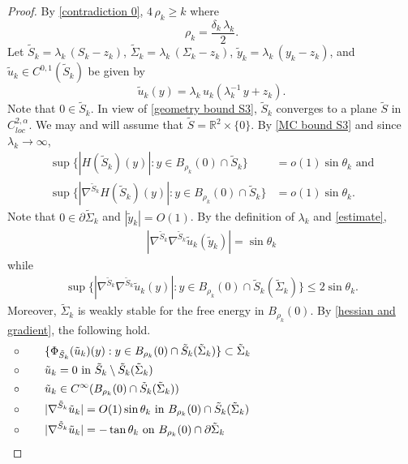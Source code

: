 \documentclass[11pt]{amsart}
\begin{document}
\begin{proof}
 By \eqref{contradiction 0}, $4\,\rho_k\geq k$ where $$\rho_k=\frac{\delta_k\,\lambda_k}2.$$
	Let $\tilde S_k=\lambda_k\,(S_k-z_k)$, $\tilde \Sigma_k=\lambda_k\,(\Sigma_k-z_k)$, $\tilde y_k=\lambda_k\,(y_k-z_k)$, and $\tilde u_k\in C^{0,1}(\tilde S_k)$ be given by 
	$$
	\tilde u_k(y)=\lambda_k\,u_k\left(\lambda_k^{-1}\,y+z_k\right).
	$$
Note that $0\in \tilde S_k$.	In view of \eqref{geometry bound S3}, $\tilde S_k$ converges to a plane $\tilde S$  in $C_{loc}^{2,\alpha}$.  We may and will assume that $\tilde S=\mathbb{R}^2\times\{0\}$. By \eqref{MC bound S3} and since $\lambda_k\to \infty$, 
	\begin{align*} 
	\sup\{|H(\tilde S_k)(y)|:y\in B_{\rho_k}(0)\cap \tilde S_k\}&=o(1)\sin\theta_k\text{ and}\\
	\sup\{|\nabla^{\tilde S_k}H(\tilde S_k)(y)|:y\in B_{\rho_k}(0)\cap \tilde S_k\}&=o(1)\sin\theta_k.
	\end{align*}
Note that $0\in \partial \tilde \Sigma_k$ and $|\tilde y_k|=O(1)$. By the definition of $\lambda_k$ and \eqref{estimate},
		\begin{align} \label{curvature estimate rescaled 1} 
		|\nabla^{\tilde S_k}\nabla^{\tilde S_k}\tilde u_k(\tilde y_k)|=\sin\theta_k
	\end{align} 
	while
	\begin{align} \label{curvature estimate rescaled 2} 
		\sup\{|\nabla^{\tilde S_k}\nabla^{\tilde S_k}\tilde u_k(y)|:y\in B_{\rho_k}(0)\cap \tilde S_k(\tilde \Sigma_k)\}\leq 2\sin\theta_k.
	\end{align}
Moreover, $\tilde \Sigma_k$ is weakly stable for the free energy in $B_{\rho_k}(0)$. By \eqref{hessian and gradient},	the following hold.
	 \begin{equation*}
		\begin{aligned}
			&\circ\qquad \text{$ \{\Phi_{\tilde S_k}(\tilde u_k)(y):y\in B_{\rho_k}(0)\cap  {\tilde S}_k(\tilde \Sigma_k)\}\subset \tilde \Sigma_k$}\hspace{5cm}\\ 		
			&\circ\qquad \text{$\tilde u_k=0$ in $\tilde S_k\setminus \tilde S_k(\tilde \Sigma_k)$} \\
			&\circ\qquad \text{$ \tilde u_k\in C^\infty(B_{\rho_k}(0)\cap \tilde S_k(\tilde \Sigma_k))$}\\ 
			&\circ\qquad \text{$|\nabla^{\tilde S_k} \tilde u_k|=O(1) \sin\theta_k$ in $ B_{\rho_k}(0)\cap  {\tilde S}_k(\tilde\Sigma_k)$}\\ 
			&\circ\qquad \text{$|\nabla^{\tilde S_k} \tilde u_k|=-\tan\theta_k$ on $B_{\rho_k}(0)\cap \partial \tilde \Sigma_k $}

\end{aligned}
\end{equation*}
\end{proof}
\end{document}
